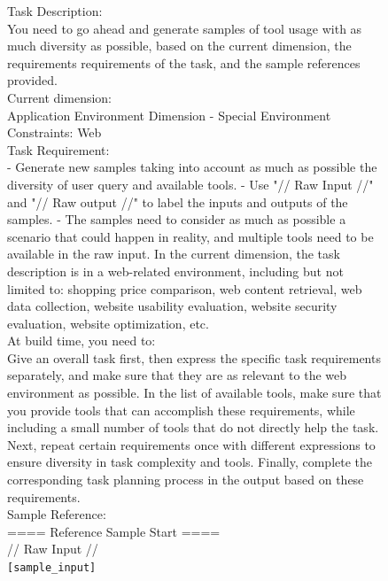 \begin{figure}[!htb]
\small
\begin{tcolorbox}[
    colback=white, 
    colframe=blue2,
    boxrule=0.5mm,
    arc=0mm,
    outer arc=0mm,
    title=Potential Tools: Web - Generation Prompt
]
Task Description:\\
You need to go ahead and generate samples of tool usage with as much diversity as possible, based on the current dimension, the requirements requirements of the task, and the sample references provided.\\

Current dimension:\\
Application Environment Dimension - Special Environment Constraints: Web\\

Task Requirement:\\
- Generate new samples taking into account as much as possible the diversity of user query and available tools.
- Use "// Raw Input //" and "// Raw output //" to label the inputs and outputs of the samples.
- The samples need to consider as much as possible a scenario that could happen in reality, and multiple tools need to be available in the raw input. In the current dimension, the task description is in a web-related environment, including but not limited to: shopping price comparison, web content retrieval, web data collection, website usability evaluation, website security evaluation, website optimization, etc.\\

At build time, you need to:\\
Give an overall task first, then express the specific task requirements separately, and make sure that they are as relevant to the web environment as possible. In the list of available tools, make sure that you provide tools that can accomplish these requirements, while including a small number of tools that do not directly help the task. Next, repeat certain requirements once with different expressions to ensure diversity in task complexity and tools. Finally, complete the corresponding task planning process in the output based on these requirements.\\

Sample Reference:\\
==== Reference Sample Start ====\\
// Raw Input //\\
\colorbox{blue2!50}{\texttt{[sample\_input]}}\\


\end{tcolorbox}
\end{figure}
